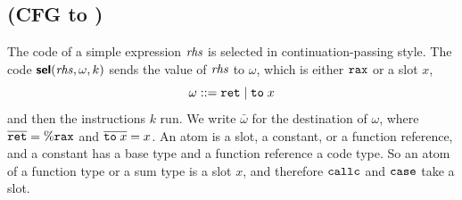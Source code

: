 \subsection{ (CFG to \instr)}
\label{app:pass-select}

The code of a simple expression $\mathit{rhs}$ is selected in continuation-passing
style. The code $\textsf{\bfseries sel}(\mathit{rhs}, \omega, k)$ sends the value of $\mathit{rhs}$ to
$\omega$, which is either
$\mathtt{rax}$ or a slot $x$,
\[
  \omega ::= \mathtt{ret} \mid \mathtt{to}\;x
\]
and then the instructions $k$ run. We write $\bar{\omega}$
for the destination of $\omega$, where $\overline{\mathtt{ret}} = \%\mathtt{rax}$
and $\overline{\mathtt{to}\;x} = x$. An atom is a slot, a constant, or a
function reference, and a constant has a base type and a function
reference a code type. So an atom of a function type or a sum type is
a slot $x$, and therefore $\mathtt{callc}$ and $\mathtt{case}$ take a slot.
